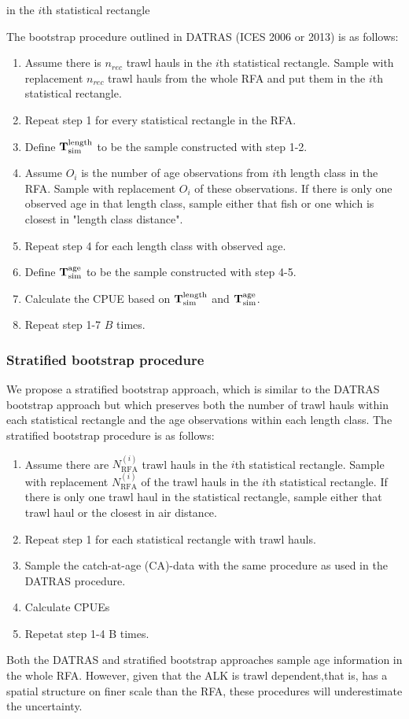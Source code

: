 \documentclass[a4paper 12pt]{article}
\numberwithin{equation}{section}
\begin{document}
in the $i$th statistical rectangle


The bootstrap procedure outlined in DATRAS (ICES 2006 or 2013) is as follows:
 \begin{enumerate} 
\item  Assume there is $n_{rec}$ trawl hauls in the $i$th statistical rectangle. Sample with replacement $n_{rec}$ trawl hauls from the whole RFA and put them in the $i$th statistical rectangle. 
\item Repeat step 1 for every statistical rectangle in the RFA. 
\item Define ${\bf T}_{\text{sim}}^{\text{length}}$ to be the sample constructed with step 1-2.
\item Assume $O_i$ is the number of age observations from $i$th length class in the RFA. Sample with replacement $O_i$ of these observations. If there is only one observed age in that length class, sample either that fish or one which is closest in "length class distance".
\item Repeat step 4 for each length class with observed age. 
\item Define ${\bf T}_{\text{sim}}^{\text{age}}$ to be the sample constructed with step 4-5.
\item Calculate the CPUE based on ${\bf T }_{\text{sim}}^{\text{length}}$ and ${\bf T}_{\text{sim}}^{\text{age}}$. 
\item Repeat step 1-7 $B$ times.
 \end{enumerate} 


\subsubsection{Stratified bootstrap procedure}
\label{stratboot}
We propose a stratified bootstrap approach, which is similar to the DATRAS bootstrap approach but which preserves  both the number of trawl hauls within each statistical rectangle and the age observations within each length class. The stratified bootstrap procedure is as follows:
\begin{enumerate}
\item Assume there are $N_{\text{RFA}}^{(i)}$ trawl hauls in the $i$th statistical rectangle.  Sample with replacement $N_{\text{RFA}}^{(i)}$ of the trawl hauls in the $i$th statistical rectangle. If there is only one trawl haul in the statistical rectangle, sample either that trawl haul or the closest in air distance. 
\item Repeat step 1 for each statistical rectangle with trawl hauls. 
\item Sample the catch-at-age (CA)-data with the same procedure as used in the DATRAS procedure.   
\item Calculate CPUEs 
\item Repetat step 1-4 B times. 
\end{enumerate}  
Both the DATRAS and stratified bootstrap approaches sample age information in the whole RFA. However, given that the ALK is trawl dependent,that is, has a spatial structure on finer scale than the RFA, these procedures will underestimate the uncertainty. 
\end{document}
